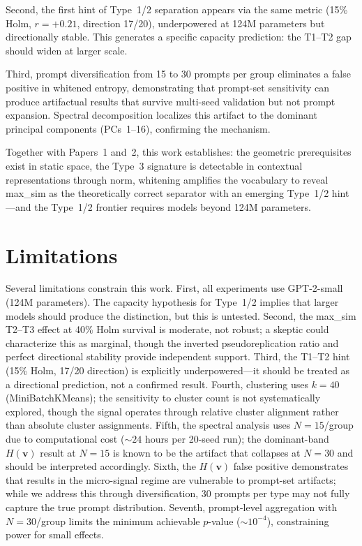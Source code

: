 \documentclass[11pt]{article}
\newcommand{\Hv}{H(\mathbf{v})}
\begin{document}
Second, the first hint of Type~1/2 separation appears via the same metric (15\% Holm, $r = +0.21$, direction 17/20), underpowered at 124M parameters but directionally stable. This generates a specific capacity prediction: the T1--T2 gap should widen at larger scale.

Third, prompt diversification from 15 to 30 prompts per group eliminates a false positive in whitened entropy, demonstrating that prompt-set sensitivity can produce artifactual results that survive multi-seed validation but not prompt expansion. Spectral decomposition localizes this artifact to the dominant principal components (PCs~1--16), confirming the mechanism.

Together with Papers~1 and~2, this work establishes: the geometric prerequisites exist in static space, the Type~3 signature is detectable in contextual representations through norm, whitening amplifies the vocabulary to reveal max\_sim as the theoretically correct separator with an emerging Type~1/2 hint---and the Type~1/2 frontier requires models beyond 124M parameters.


\section*{Limitations}

Several limitations constrain this work. First, all experiments use GPT-2-small (124M parameters). The capacity hypothesis for Type~1/2 implies that larger models should produce the distinction, but this is untested. Second, the max\_sim T2--T3 effect at 40\% Holm survival is moderate, not robust; a skeptic could characterize this as marginal, though the inverted pseudoreplication ratio and perfect directional stability provide independent support. Third, the T1--T2 hint (15\% Holm, 17/20 direction) is explicitly underpowered---it should be treated as a directional prediction, not a confirmed result. Fourth, clustering uses $k = 40$ (MiniBatchKMeans); the sensitivity to cluster count is not systematically explored, though the signal operates through relative cluster alignment rather than absolute cluster assignments. Fifth, the spectral analysis uses $N = 15$/group due to computational cost (${\sim}24$ hours per 20-seed run); the dominant-band $\Hv$ result at $N = 15$ is known to be the artifact that collapses at $N = 30$ and should be interpreted accordingly. Sixth, the $\Hv$ false positive demonstrates that results in the micro-signal regime are vulnerable to prompt-set artifacts; while we address this through diversification, 30 prompts per type may not fully capture the true prompt distribution. Seventh, prompt-level aggregation with $N = 30$/group limits the minimum achievable $p$-value (${\sim}10^{-4}$), constraining power for small effects.
\end{document}
